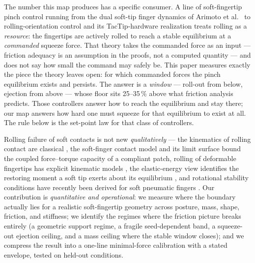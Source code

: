 \documentclass[journal]{IEEEtran}
\begin{document}
The number this map produces has a specific consumer. A line of
soft-fingertip pinch control running from the dual soft-tip finger
dynamics of Arimoto et al.\ \cite{arimoto2000dynamics,arimoto2008control}
to rolling-orientation control \cite{psomopoulou2018stable} and its
TacTip-hardware realization \cite{psomopoulou2021pinching} treats rolling
as a \emph{resource}: the fingertips are actively rolled to reach a stable
equilibrium at a \emph{commanded} squeeze force. That theory takes the
commanded force as an input --- friction adequacy is an assumption in the
proofs, not a computed quantity --- and does not say how small the command
may safely be. This paper measures exactly the piece the theory leaves
open: for which commanded forces the pinch equilibrium exists and
persists. The answer is a \emph{window} --- roll-out from below, ejection
from above --- whose floor sits 25--35\,\% above what friction analysis
predicts. Those controllers answer how to reach the equilibrium and stay
there; our map answers how hard one must squeeze for that equilibrium to
exist at all. The rule below is the set-point law for that class of
controllers.

Rolling failure of soft contacts is not new \emph{qualitatively} --- the
kinematics of rolling contact are classical \cite{montana1988kinematics},
the soft-finger contact model and its limit surface
\cite{goyal1991planar,kao1992quasistatic,xydas1999modeling} bound the
coupled force--torque capacity of a compliant patch, rolling of deformable
fingertips has explicit kinematic models \cite{doulgeri2003grasping}, the
elastic-energy view identifies the restoring moment a soft tip exerts
about its equilibrium \cite{inoue2006elastic}, and rotational stability
conditions have recently been derived for soft pneumatic fingers
\cite{jang2024rotational}. Our contribution is \emph{quantitative and
operational}: we measure where the boundary actually lies for a realistic
soft-fingertip geometry across posture, mass, shape, friction, and
stiffness; we identify the regimes where the friction picture breaks
entirely (a geometric support regime, a fragile seed-dependent band, a
squeeze-out ejection ceiling, and a mass ceiling where the stable window
closes); and we compress the result into a one-line minimal-force
calibration with a stated envelope, tested on held-out conditions.
\end{document}
